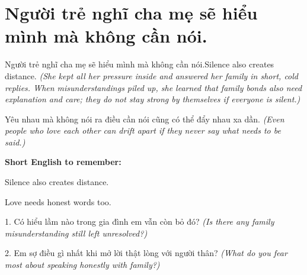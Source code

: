 \section{Người trẻ nghĩ cha mẹ sẽ hiểu mình mà không cần nói.}
\begin{truyen}{Người trẻ nghĩ cha mẹ sẽ hiểu mình mà không cần nói.}{Silence also creates distance.}
\textit{(She kept all her pressure inside and answered her family in short, cold replies. When misunderstandings piled up, she learned that family bonds also need explanation and care; they do not stay strong by themselves if everyone is silent.)}
\end{truyen}
\begin{baihoc}
Yêu nhau mà không nói ra điều cần nói cũng có thể đẩy nhau xa dần.
\textit{(Even people who love each other can drift apart if they never say what needs to be said.)}
\end{baihoc}
\begin{ghinhoanh}
\textbf{Short English to remember:}

Silence also creates distance.

Love needs honest words too.
\end{ghinhoanh}
\begin{tuhocnhanh}
1. Có hiểu lầm nào trong gia đình em vẫn còn bỏ đó? \textit{(Is there any family misunderstanding still left unresolved?)}

2. Em sợ điều gì nhất khi mở lời thật lòng với người thân? \textit{(What do you fear most about speaking honestly with family?)}
\end{tuhocnhanh}
\ngancach

